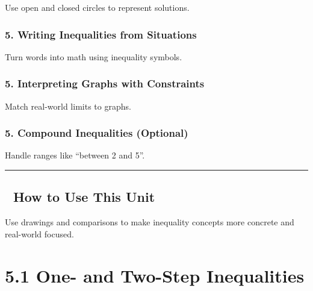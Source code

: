 \documentclass[
  letterpaper,
]{scrrept}
\begin{document}
Use open and closed circles to represent solutions.

\subsection*{5. Writing Inequalities from
Situations}\label{writing-inequalities-from-situations}

Turn words into math using inequality symbols.

\subsection*{5. Interpreting Graphs with
Constraints}\label{interpreting-graphs-with-constraints}

Match real-world limits to graphs.

\subsection*{5. Compound Inequalities
(Optional)}\label{compound-inequalities-optional}

Handle ranges like ``between 2 and 5''.

\begin{center}\rule{0.5\linewidth}{0.5pt}\end{center}

\section*{🧭 How to Use This Unit}\label{how-to-use-this-unit-2}


Use drawings and comparisons to make inequality concepts more concrete
and real-world focused.

\chapter*{5.1 One- and Two-Step
Inequalities}\label{one--and-two-step-inequalities-1}

\end{document}
